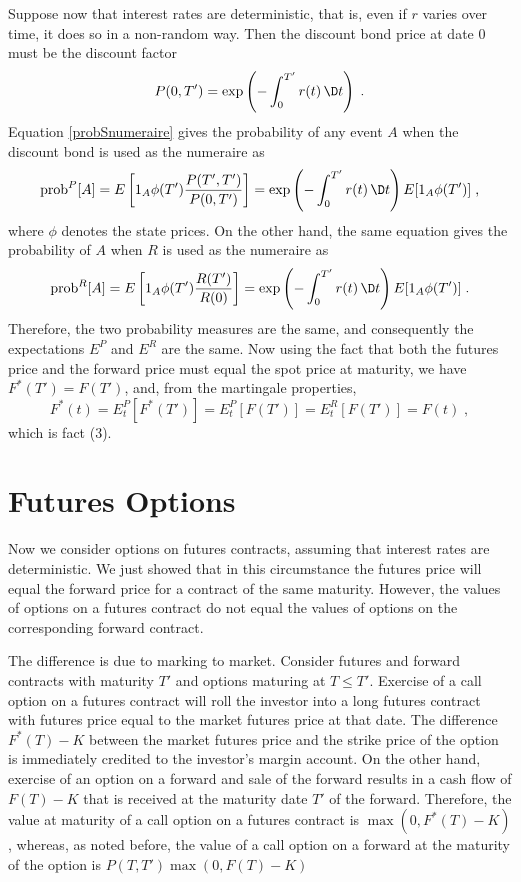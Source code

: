 Suppose now that interest rates are deterministic, that is, even if $r$ varies over time, it does so in a non-random way.  Then the discount bond price at date 0 must be the discount factor
$$P(0,T') = \exp\left(-\int_0^{T'} r(t)\,\D t\right)\; .$$
Equation \eqref{probSnumeraire} gives the probability of any event $A$ when the discount bond is used as the numeraire as
$$\text{prob}^P[A] = E\left[1_A\phi(T')\frac{P(T',T')}{P(0,T')}\right] = \exp\left(-\int_0^{T'} r(t)\,\D t\right)E[1_A\phi(T')]\; ,$$
where $\phi$ denotes the state prices.
On the other hand, the same equation gives the probability of $A$ when $R$ is used as the numeraire as
$$\text{prob}^R[A] = E\left[1_A\phi(T')\frac{R(T')}{R(0)}\right] = \exp\left(-\int_0^{T'} r(t)\,\D t\right)E[1_A\phi(T')]\; .$$
Therefore, the two probability measures are the same, and consequently the expectations $E^P$ and $E^R$ are the same.  Now using the fact that both the futures price and the forward price must equal the spot price at maturity, we have $F^*(T') = F(T')$, and, from the martingale properties,
$$F^*(t) = E_t^P[F^*(T')] = E_t^P[F(T')] = E_t^R[F(T')] = F(t)\; ,$$
which is fact (3).



\section{Futures Options}\label{s_futuresoptions}

Now we consider options on futures contracts,  assuming that interest rates are deterministic.  We just showed that in this circumstance the futures price will equal the forward price for a contract of the same maturity.  However, the values of options on a futures contract do not equal the values of options on the corresponding forward contract.  

The difference is due to marking to market.  Consider futures and forward contracts with maturity $T'$ and options maturing at $T \leq T'$.  Exercise of a call option on a futures contract will roll the investor into a long futures contract with futures price equal to the market futures price at that date.  The difference $F^*(T)-K$ between the market futures price and the strike price of the option is immediately credited to the investor's margin account.  On the other hand, exercise of an option on a forward and sale of the forward results in a cash flow of $F(T) - K$ that is received at the maturity date $T'$ of the forward.  Therefore, the value at maturity of a call option on a futures contract is
$\max(0,F^*(T)-K)$, whereas, as noted before, the value of a call option on a forward at the maturity of the option is $P(T,T')\max(0,F(T)-K)$

